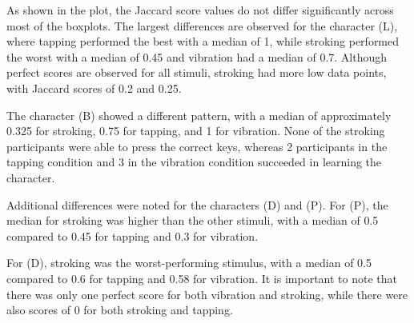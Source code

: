 As shown in the plot, the Jaccard score values do not differ significantly across most of the boxplots. 
The largest differences are observed for the character (L), where tapping performed the best with a median of 1, while stroking performed the worst with a median of 0.45 and vibration had a median of 0.7. 
Although perfect scores are observed for all stimuli, stroking had more low data points, with Jaccard scores of 0.2 and 0.25.

The character (B) showed a different pattern, with a median of approximately 0.325 for stroking, 0.75 for tapping, and 1 for vibration. 
None of the stroking participants were able to press the correct keys, whereas 2 participants in the tapping condition and 3 in the vibration condition succeeded in learning the character.

Additional differences were noted for the characters (D) and (P). 
For (P), the median for stroking was higher than the other stimuli, with a median of 0.5 compared to 0.45 for tapping and 0.3 for vibration. 

For (D), stroking was the worst-performing stimulus, with a median of 0.5 compared to 0.6 for tapping and 0.58 for vibration. 
It is important to note that there was only one perfect score for both vibration and stroking, while there were also scores of 0 for both stroking and tapping.


